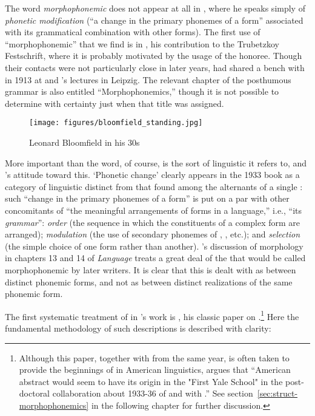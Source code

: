 The word \emph{morphophonemic} does not appear at all in
\citet{bloomfield:lg}, where he speaks simply of \emph{phonetic
  modification} (``a {change} in the primary phonemes of a form''
associated with its grammatical combination with other forms). The
first use of ``morphophonemic'' that we find is in
\citealt{bloomfield:menomini_morphophonemics}, his contribution
to the Trubetzkoy Festschrift, where it is probably motivated by the
usage of the honoree. Though their contacts were not particularly
close in later years, {\Bloomfield} had shared a bench with {\Trubetzkoy} in
1913 at {\Leskien} and {\Brugmann}'s lectures in {Leipzig}. The relevant
chapter of the posthumous  grammar is also entitled
``Morphophonemics,'' though it is not possible to determine with
certainty just when that title was assigned.

\begin{wrapfigure}{r}{.35\textwidth}
  \texttt{[image: figures/bloomfield\_standing.jpg]}
  \caption{Leonard Bloomfield in his 30s}
  \label{fig:ch.bloomfield.bloomfield_standing}
\end{wrapfigure}
More important than the word, of course, is the sort of linguistic
 it refers to, and {\Bloomfield}'s attitude toward
this. `Phonetic change' clearly appears in the 1933 book as a category
of linguistic  distinct from that found among the alternants
of a single : such ``change in the primary phonemes of a form''
is put on a par with other concomitants of ``the meaningful
arrangements of forms in a language,'' i.e., ``its \emph{grammar}'':
\emph{order} (the sequence in which the constituents of a complex form
are arranged); \emph{modulation} (the use of secondary phonemes of
, , etc.); and \emph{selection} (the simple choice of one
form rather than another). {\Bloomfield}'s discussion of morphology in
chapters 13 and 14 of \textsl{Language} treats a great deal of the
 that would be called morphophonemic by later writers. It is
clear that this  is dealt with as  between
distinct phonemic forms, and not as  between distinct
realizations of the same phonemic form.

The first systematic treatment of  in {\Bloomfield}'s work
is \citealt{bloomfield:menomini_morphophonemics}, his classic paper on
.\footnote{Although this paper, together with
  \citealt{swadesh.voegelin39:alternation} from the same year, is
  often taken to provide the beginnings of  in American
  linguistics, \citet[278]{hymes83:hist.ling.anthro} argues that
  ``American abstract  would seem to have its origin in
  the "First Yale School" in the post-doctoral collaboration about
  1933-36 of {\Newman} and {\Swadesh} with {\Sapir}.'' See
  section~\ref{sec:struct-morphophonemics} in the following chapter
  for further discussion.} Here the fundamental methodology of such
descriptions is described with clarity:


